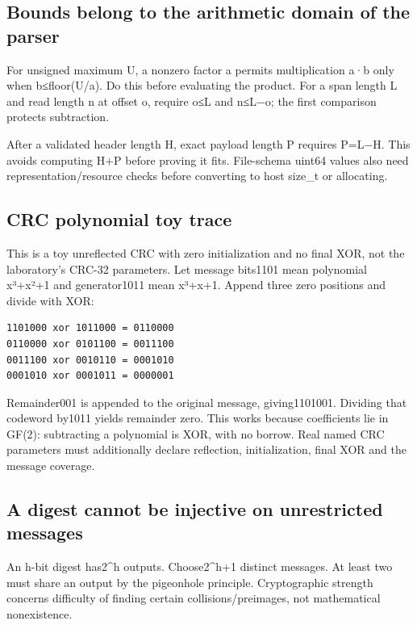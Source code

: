 \subsection{Bounds belong to the arithmetic domain of the parser}\label{03-visual-computing-i-ch018-bounds-belong-to-the-arithmetic-domain-of-the-parser}

For unsigned maximum U, a nonzero factor a permits multiplication a·b only when b≤floor(U/a). Do this before evaluating the product. For a span length L and read length n at offset o, require o≤L and n≤L−o; the first comparison protects subtraction.

After a validated header length H, exact payload length P requires P=L−H. This avoids computing H+P before proving it fits. File-schema uint64 values also need representation/resource checks before converting to host size\_t or allocating.

\subsection{CRC polynomial toy trace}\label{03-visual-computing-i-ch018-crc-polynomial-toy-trace}

This is a toy unreflected CRC with zero initialization and no final XOR, not the laboratory's CRC-32 parameters. Let message bits1101 mean polynomial x³+x²+1 and generator1011 mean x³+x+1. Append three zero positions and divide with XOR:

\begin{verbatim}
1101000 xor 1011000 = 0110000
0110000 xor 0101100 = 0011100
0011100 xor 0010110 = 0001010
0001010 xor 0001011 = 0000001
\end{verbatim}

Remainder001 is appended to the original message, giving1101001. Dividing that codeword by1011 yields remainder zero. This works because coefficients lie in GF(2): subtracting a polynomial is XOR, with no borrow. Real named CRC parameters must additionally declare reflection, initialization, final XOR and the message coverage.

\subsection{A digest cannot be injective on unrestricted messages}\label{03-visual-computing-i-ch018-a-digest-cannot-be-injective-on-unrestricted-messages}

An h-bit digest has2\^{}h outputs. Choose2\^{}h+1 distinct messages. At least two must share an output by the pigeonhole principle. Cryptographic strength concerns difficulty of finding certain collisions/preimages, not mathematical nonexistence.

